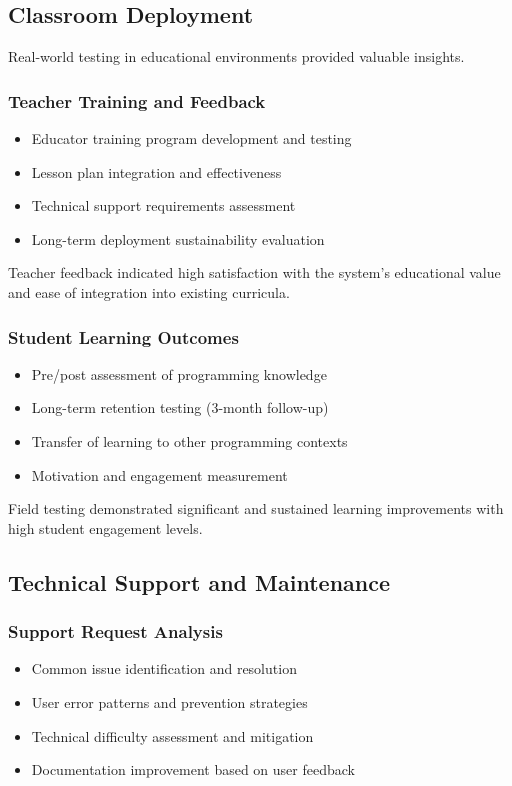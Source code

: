 \subsection{Classroom Deployment}

Real-world testing in educational environments provided valuable insights.

\subsubsection{Teacher Training and Feedback}
\begin{itemize}
    \item Educator training program development and testing
    \item Lesson plan integration and effectiveness
    \item Technical support requirements assessment
    \item Long-term deployment sustainability evaluation
\end{itemize}

Teacher feedback indicated high satisfaction with the system's educational value and ease of integration into existing curricula.

\subsubsection{Student Learning Outcomes}
\begin{itemize}
    \item Pre/post assessment of programming knowledge
    \item Long-term retention testing (3-month follow-up)
    \item Transfer of learning to other programming contexts
    \item Motivation and engagement measurement
\end{itemize}

Field testing demonstrated significant and sustained learning improvements with high student engagement levels.

\subsection{Technical Support and Maintenance}

\subsubsection{Support Request Analysis}
\begin{itemize}
    \item Common issue identification and resolution
    \item User error patterns and prevention strategies
    \item Technical difficulty assessment and mitigation
    \item Documentation improvement based on user feedback
\end{itemize}

